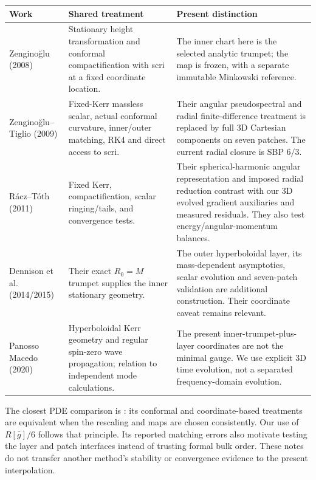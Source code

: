\documentclass[11pt,letterpaper]{article}
\newcommand{\G}{\bar g}
\begin{document}
\begin{center}\small
\begin{tabularx}{\linewidth}{@{}p{3.0cm}X X@{}}\toprule
Work & Shared treatment & Present distinction \\\midrule
Zengino\u glu (2008) \cite{scrifixing} & Stationary height transformation and conformal compactification with scri at a fixed coordinate location. & The inner chart here is the selected analytic trumpet; the map is frozen, with a separate immutable Minkowski reference. \\
Zengino\u glu--Tiglio (2009) \cite{matching} & Fixed-Kerr massless scalar, actual conformal curvature, inner/outer matching, RK4 and direct access to scri. & Their angular pseudospectral and radial finite-difference treatment is replaced by full 3D Cartesian components on seven patches. The current radial closure is SBP $6/3$. \\
R\'acz--T\'oth (2011) \cite{tails} & Fixed Kerr, compactification, scalar ringing/tails, and convergence tests. & Their spherical-harmonic angular representation and imposed radial reduction contrast with our 3D evolved gradient auxiliaries and measured residuals. They also test energy/angular-momentum balances. \\
Dennison et al. (2014/2015) \cite{trumpet} & Their exact $R_0=M$ trumpet supplies the inner stationary geometry. & The outer hyperboloidal layer, its mass-dependent asymptotics, scalar evolution and seven-patch validation are additional construction. Their coordinate caveat remains relevant. \\
Panosso Macedo (2020) \cite{macedo} & Hyperboloidal Kerr geometry and regular spin-zero wave propagation; relation to independent mode calculations. & The present inner-trumpet-plus-layer coordinates are not the minimal gauge. We use explicit 3D time evolution, not a separated frequency-domain evolution. \\\bottomrule
\end{tabularx}\end{center}

The closest PDE comparison is \cite{matching}: its conformal and coordinate-based treatments are equivalent when the rescaling and maps are chosen consistently. Our use of $R[\G]/6$ follows that principle. Its reported matching errors also motivate testing the layer and patch interfaces instead of trusting formal bulk order. These notes do not transfer another method's stability or convergence evidence to the present interpolation.
\end{document}
